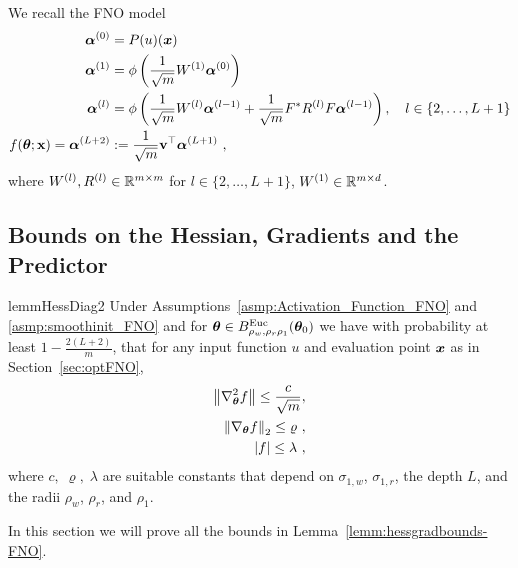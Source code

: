 We recall the FNO model
\begin{align}
    \begin{aligned}
\boldsymbol{\alpha}^{(0)} &= P(u)({\bm{x}})\\
\boldsymbol{\alpha}^{(1)} &= \phi\left(
        \frac{1}{\sqrt{m}} W^{(1)} \boldsymbol{\alpha}^{(0)}
    \right)\\
\boldsymbol{\alpha}^{(l)} & = \phi\left(
        \frac{1}{\sqrt{m}} W^{(l)} \boldsymbol{\alpha}^{(l-1)} +
        \frac{1}{\sqrt{m}} F^{*} R^{(l)} F \boldsymbol{\alpha}^{(l-1)}
    \right),\quad l\in \{2,\dots,L+1\}\\
    f({\bm{\theta}};\mathbf{x})  = \boldsymbol{\alpha}^{(L+2)} &:= \frac{1}{\sqrt{m}} \mathbf{v}^\top \boldsymbol{\alpha}^{(L+1)}~,
    \end{aligned}
\label{eq:FNO_predictor_app}
\end{align}
where $W^{(l)}, R^{(l)} \in {\mathbb{R}}^{m \times m}$ for $l \in \{2,\ldots,L+1\}$, $W^{(1)} \in {\mathbb{R}}^{m \times d}$. 
%

\subsection{Bounds on the Hessian, Gradients and the Predictor}

\begin{restatable}{lemm}{HessDiag2}
\label{lemm:hessgradbounds-FNO}
Under Assumptions~\ref{asmp:Activation_Function_FNO} and \ref{asmp:smoothinit_FNO} and for ${\bm{\theta}} \in B^{\mathrm{Euc}}_{\rho_w,\rho_r\rho_1}({\bm{\theta}}_0)$ we have with probability at least {$1-\frac{2(L+2)}{m}$}, that for any input function $u$ and evaluation point ${\bm{x}}$ as in Section~\ref{sec:optFNO},
\begin{align}
        \left\|\nabla^2_{{\bm{\theta}}} f\right\| \leq \frac{c}{\sqrt{m}}, \label{eq:hessianBoundG_fg_FNO} \\
    \left\| \nabla_{{\bm{\theta}}} f\right\|_2 \leq \varrho~,\label{eq:gradientBoundG_fg_FNO}\\
     |f| \leq \lambda~,\label{eq:predictorBoundG_fg_FNO}
\end{align}
where $c,\;\varrho,\;\lambda$ are suitable constants that depend on $\sigma_{1,w}$, $\sigma_{1,r}$, the depth $L$, and the radii $\rho_w$, $\rho_r$, and $\rho_1$. 
\end{restatable}

In this section we will prove all the bounds in Lemma~\ref{lemm:hessgradbounds-FNO}.
%

